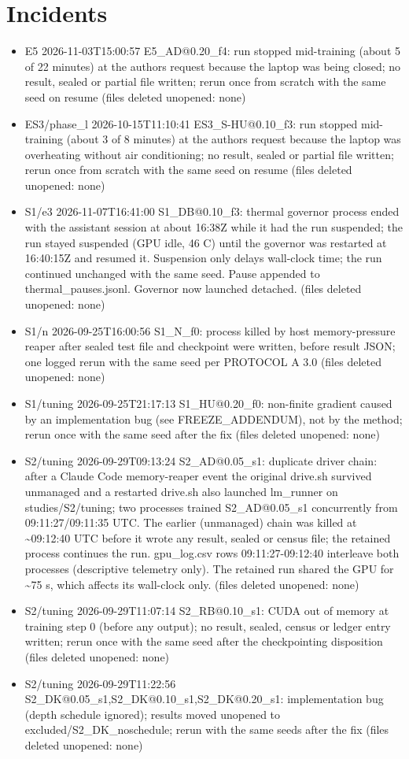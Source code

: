 \documentclass[11pt]{article}
\begin{document}
\section{Incidents}\begin{itemize}
\item E5 2026-11-03T15:00:57 E5\_AD@0.20\_f4: run stopped mid-training (about 5 of 22 minutes) at the authors request because the laptop was being closed; no result, sealed or partial file written; rerun once from scratch with the same seed on resume (files deleted unopened: none)
\item ES3/phase\_l 2026-10-15T11:10:41 ES3\_S-HU@0.10\_f3: run stopped mid-training (about 3 of 8 minutes) at the authors request because the laptop was overheating without air conditioning; no result, sealed or partial file written; rerun once from scratch with the same seed on resume (files deleted unopened: none)
\item S1/e3 2026-11-07T16:41:00 S1\_DB@0.10\_f3: thermal governor process ended with the assistant session at about 16:38Z while it had the run suspended; the run stayed suspended (GPU idle, 46 C) until the governor was restarted at 16:40:15Z and resumed it. Suspension only delays wall-clock time; the run continued unchanged with the same seed. Pause appended to thermal\_pauses.jsonl. Governor now launched detached. (files deleted unopened: none)
\item S1/n 2026-09-25T16:00:56 S1\_N\_f0: process killed by host memory-pressure reaper after sealed test file and checkpoint were written, before result JSON; one logged rerun with the same seed per PROTOCOL A 3.0 (files deleted unopened: none)
\item S1/tuning 2026-09-25T21:17:13 S1\_HU@0.20\_f0: non-finite gradient caused by an implementation bug (see FREEZE\_ADDENDUM), not by the method; rerun once with the same seed after the fix (files deleted unopened: none)
\item S2/tuning 2026-09-29T09:13:24 S2\_AD@0.05\_s1: duplicate driver chain: after a Claude Code memory-reaper event the original drive.sh survived unmanaged and a restarted drive.sh also launched lm\_runner on studies/S2/tuning; two processes trained S2\_AD@0.05\_s1 concurrently from 09:11:27/09:11:35 UTC. The earlier (unmanaged) chain was killed at \textasciitilde{}09:12:40 UTC before it wrote any result, sealed or census file; the retained process continues the run. gpu\_log.csv rows 09:11:27-09:12:40 interleave both processes (descriptive telemetry only). The retained run shared the GPU for \textasciitilde{}75 s, which affects its wall-clock only. (files deleted unopened: none)
\item S2/tuning 2026-09-29T11:07:14 S2\_RB@0.10\_s1: CUDA out of memory at training step 0 (before any output); no result, sealed, census or ledger entry written; rerun once with the same seed after the checkpointing disposition (files deleted unopened: none)
\item S2/tuning 2026-09-29T11:22:56 S2\_DK@0.05\_s1,S2\_DK@0.10\_s1,S2\_DK@0.20\_s1: implementation bug (depth schedule ignored); results moved unopened to excluded/S2\_DK\_noschedule; rerun with the same seeds after the fix (files deleted unopened: none)
\end{itemize}
\end{document}
